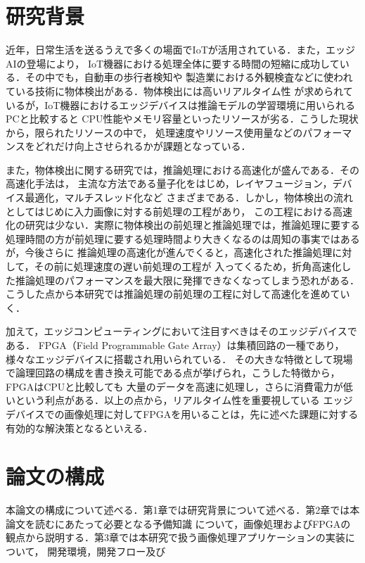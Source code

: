 \documentclass[11pt,a4j]{jreport}
\begin{document}
\section{研究背景}

近年，日常生活を送るうえで多くの場面でIoTが活用されている．また，エッジAIの登場により，
IoT機器における処理全体に要する時間の短縮に成功している．その中でも，自動車の歩行者検知や
製造業における外観検査などに使われている技術に物体検出がある．物体検出には高いリアルタイム性
が求められているが，IoT機器におけるエッジデバイスは推論モデルの学習環境に用いられるPCと比較すると
CPU性能やメモリ容量といったリソースが劣る．こうした現状から，限られたリソースの中で，
処理速度やリソース使用量などのパフォーマンスをどれだけ向上させられるかが課題となっている．

また，物体検出に関する研究では，推論処理における高速化が盛んである．その高速化手法は，
主流な方法である量子化をはじめ，レイヤフュージョン，デバイス最適化，マルチスレッド化など
さまざまである．しかし，物体検出の流れとしてはじめに入力画像に対する前処理の工程があり，
この工程における高速化の研究は少ない．実際に物体検出の前処理と推論処理では，推論処理に要する
処理時間の方が前処理に要する処理時間より大きくなるのは周知の事実ではあるが，今後さらに
推論処理の高速化が進んでくると，高速化された推論処理に対して，その前に処理速度の遅い前処理の工程が
入ってくるため，折角高速化した推論処理のパフォーマンスを最大限に発揮できなくなってしまう恐れがある．
こうした点から本研究では推論処理の前処理の工程に対して高速化を進めていく．

加えて，エッジコンピューティングにおいて注目すべきはそのエッジデバイスである．
FPGA（Field Programmable Gate Array）は集積回路の一種であり，様々なエッジデバイスに搭載され用いられている．
その大きな特徴として現場で論理回路の構成を書き換え可能である点が挙げられ，こうした特徴から，FPGAはCPUと比較しても
大量のデータを高速に処理し，さらに消費電力が低いという利点がある．以上の点から，リアルタイム性を重要視している
エッジデバイスでの画像処理に対してFPGAを用いることは，先に述べた課題に対する有効的な解決策となるといえる．


\section{論文の構成}

本論文の構成について述べる．第1章では研究背景について述べる．第2章では本論文を読むにあたって必要となる予備知識
について，画像処理およびFPGAの観点から説明する．第3章では本研究で扱う画像処理アプリケーションの実装について，
開発環境，開発フロー及び
\end{document}
